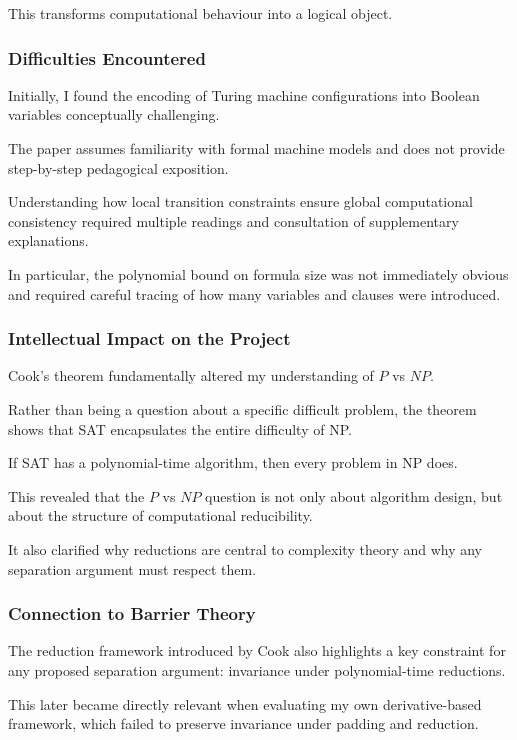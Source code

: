 \documentclass[12pt]{article}
\begin{document}
This transforms computational behaviour into a logical object.

\subsubsection*{Difficulties Encountered}

Initially, I found the encoding of Turing machine configurations into Boolean variables conceptually challenging.

The paper assumes familiarity with formal machine models and does not provide step-by-step pedagogical exposition.

Understanding how local transition constraints ensure global computational consistency required multiple readings and consultation of supplementary explanations.

In particular, the polynomial bound on formula size was not immediately obvious and required careful tracing of how many variables and clauses were introduced.

\subsubsection*{Intellectual Impact on the Project}

Cook's theorem fundamentally altered my understanding of $P$ vs $NP$.

Rather than being a question about a specific difficult problem, the theorem shows that SAT encapsulates the entire difficulty of NP.

If SAT has a polynomial-time algorithm, then every problem in NP does.

This revealed that the $P$ vs $NP$ question is not only about algorithm design, but about the structure of computational reducibility.

It also clarified why reductions are central to complexity theory and why any separation argument must respect them.

\subsubsection*{Connection to Barrier Theory}

The reduction framework introduced by Cook also highlights a key constraint for any proposed separation argument: invariance under polynomial-time reductions.

This later became directly relevant when evaluating my own derivative-based framework, which failed to preserve invariance under padding and reduction.
\end{document}
